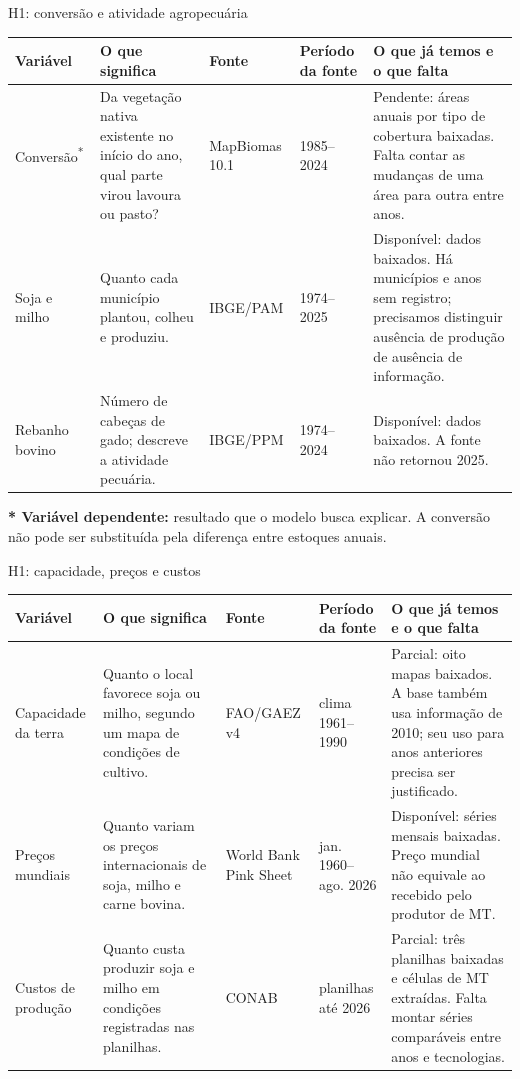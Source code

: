 \documentclass[aspectratio=169,11pt]{beamer}
\newcommand{\disp}{\textcolor{azul}{Disponível}}
\newcommand{\parcial}{\textcolor{orange!75!black}{Parcial}}
\newcommand{\pend}{\textcolor{red!70!black}{Pendente}}
\begin{document}
\begin{frame}{H1: conversão e atividade agropecuária}
\fontsize{9.2}{11.2}\selectfont
\setlength{\tabcolsep}{3pt}
\begin{tabularx}{\textwidth}{P{2.0cm} P{3.25cm} P{1.75cm} P{1.65cm} X}
\toprule
\textbf{Variável} & \textbf{O que significa} & \textbf{Fonte} & \textbf{Período da fonte} & \textbf{O que já temos e o que falta} \\
\midrule
Conversão\textsuperscript{*} & Da vegetação nativa existente no início do ano, qual parte virou lavoura ou pasto? & MapBiomas 10.1 & 1985--2024 & \pend: áreas anuais por tipo de cobertura baixadas. Falta contar as mudanças de uma área para outra entre anos. \\
Soja e milho & Quanto cada município plantou, colheu e produziu. & IBGE/PAM & 1974--2025 & \disp: dados baixados. Há municípios e anos sem registro; precisamos distinguir ausência de produção de ausência de informação. \\
Rebanho bovino & Número de cabeças de gado; descreve a atividade pecuária. & IBGE/PPM & 1974--2024 & \disp: dados baixados. A fonte não retornou 2025. \\
\bottomrule
\end{tabularx}
\medskip
\small\textbf{* Variável dependente:} resultado que o modelo busca explicar. A conversão não pode ser substituída pela diferença entre estoques anuais.
\end{frame}

\begin{frame}{H1: capacidade, preços e custos}
\fontsize{9.2}{11.2}\selectfont
\setlength{\tabcolsep}{3pt}
\begin{tabularx}{\textwidth}{P{2.0cm} P{3.25cm} P{1.75cm} P{1.65cm} X}
\toprule
\textbf{Variável} & \textbf{O que significa} & \textbf{Fonte} & \textbf{Período da fonte} & \textbf{O que já temos e o que falta} \\
\midrule
Capacidade da terra & Quanto o local favorece soja ou milho, segundo um mapa de condições de cultivo. & FAO/GAEZ v4 & clima 1961--1990 & \parcial: oito mapas baixados. A base também usa informação de 2010; seu uso para anos anteriores precisa ser justificado. \\
Preços mundiais & Quanto variam os preços internacionais de soja, milho e carne bovina. & World Bank Pink Sheet & jan. 1960--ago. 2026 & \disp: séries mensais baixadas. Preço mundial não equivale ao recebido pelo produtor de MT. \\
Custos de produção & Quanto custa produzir soja e milho em condições registradas nas planilhas. & CONAB & planilhas até 2026 & \parcial: três planilhas baixadas e células de MT extraídas. Falta montar séries comparáveis entre anos e tecnologias. \\
\bottomrule
\end{tabularx}
\end{frame}
\end{document}
